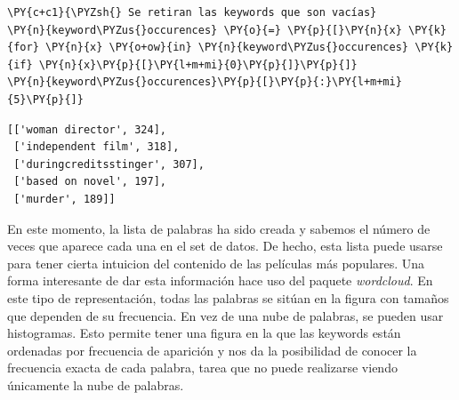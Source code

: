     \begin{tcolorbox}[breakable, size=fbox, boxrule=1pt, pad at break*=1mm,colback=cellbackground, colframe=cellborder]
\begin{Verbatim}[commandchars=\\\{\}]
\PY{c+c1}{\PYZsh{} Se retiran las keywords que son vacías}
\PY{n}{keyword\PYZus{}occurences} \PY{o}{=} \PY{p}{[}\PY{n}{x} \PY{k}{for} \PY{n}{x} \PY{o+ow}{in} \PY{n}{keyword\PYZus{}occurences} \PY{k}{if} \PY{n}{x}\PY{p}{[}\PY{l+m+mi}{0}\PY{p}{]}\PY{p}{]}
\PY{n}{keyword\PYZus{}occurences}\PY{p}{[}\PY{p}{:}\PY{l+m+mi}{5}\PY{p}{]}
\end{Verbatim}
\end{tcolorbox}

            \begin{tcolorbox}[breakable, boxrule=.5pt, size=fbox, pad at break*=1mm, opacityfill=0]
\begin{Verbatim}[commandchars=\\\{\}]
[['woman director', 324],
 ['independent film', 318],
 ['duringcreditsstinger', 307],
 ['based on novel', 197],
 ['murder', 189]]
\end{Verbatim}
\end{tcolorbox}
        
    En este momento, la lista de palabras ha sido creada y sabemos el número
de veces que aparece cada una en el set de datos. De hecho, esta lista
puede usarse para tener cierta intuicion del contenido de las películas
más populares. Una forma interesante de dar esta información hace uso
del paquete \emph{wordcloud}. En este tipo de representación, todas las
palabras se sitúan en la figura con tamaños que dependen de su
frecuencia. En vez de una nube de palabras, se pueden usar histogramas.
Esto permite tener una figura en la que las keywords están ordenadas por
frecuencia de aparición y nos da la posibilidad de conocer la frecuencia
exacta de cada palabra, tarea que no puede realizarse viendo únicamente
la nube de palabras.

